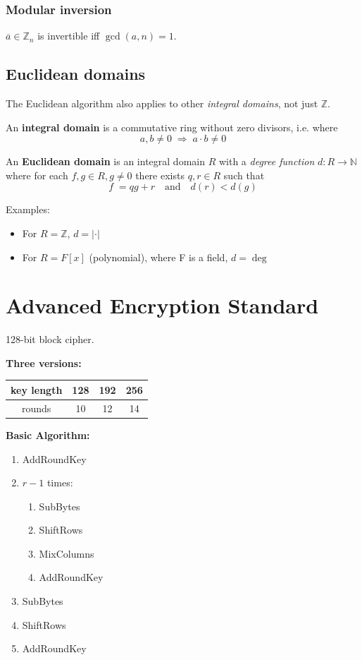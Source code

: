 \documentclass[a4paper]{scrartcl}
\newcommand\N{\mathbb N}
\newcommand\Z{\mathbb Z}
\begin{document}
\subsubsection{Modular inversion}

$\overline a\in\Z_n$ is invertible iff $\gcd(a,n)=1$.

\subsection{Euclidean domains}

The Euclidean algorithm also applies to other \textit{integral domains}, not just $\Z$.

An \textbf{integral domain} is a commutative ring without zero divisors, i.e. where
\[a,b\neq0\;\Rightarrow\;a\cdot b\neq0\]

An \textbf{Euclidean domain} is an integral domain $R$ with a \textit{degree function}
$d: R\rightarrow \N$ where for each $f,g\in R, g\neq0$ there
exists $q,r\in R$ such that \[f\;=qg+r\quad\text{and}\quad d(r)<d(g)\]

Examples:\begin{itemize}
    \item For $R=\Z$, $d = |\cdot|$
    \item For $R=F[x]$ (polynomial), where F is a field, $d=\deg$
\end{itemize}

\section{Advanced Encryption Standard}

128-bit block cipher.

\textbf{Three versions:}
\begin{center}
    \begin{tabular}{c|ccc}
        key length & 128 & 192 & 256 \\
        \hline
        rounds & 10 & 12 & 14
    \end{tabular}
\end{center}

\textbf{Basic Algorithm:}
\begin{enumerate}
    \itemsep-5pt
    \item AddRoundKey
    \item $r-1$ times:
        \vspace*{-5pt}
        \begin{enumerate}[label=\arabic*.]
        \itemsep-5pt
            \item SubBytes
            \item ShiftRows
            \item MixColumns
            \item AddRoundKey
        \end{enumerate}
    \item SubBytes
    \item ShiftRows
    \item AddRoundKey
\end{enumerate}
\end{document}
